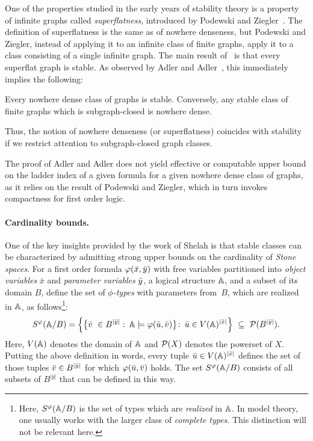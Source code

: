   One of the properties studied in the early 
  years of stability theory is 
  a property of infinite graphs  called \emph{superflatness}, introduced by Podewski and Ziegler~\cite{podewski1978stable}.
  The definition of superflatness is the same as   of nowhere denseness, but 
   Podewski and Ziegler,
  instead of applying it to an infinite class of finite graphs, apply it to a class consisting of a single infinite graph.
  The main result of~\cite{podewski1978stable} is that every superflat graph is stable.   
As observed by Adler and Adler~\cite{adler2014interpreting}, 
this immediately implies  the following:
 \begin{theorem}\label{thm:adleradler}
 	Every nowhere dense class of graphs is stable. Conversely, any stable class of finite graphs which is subgraph-closed  is nowhere dense.
 \end{theorem}
 Thus, the notion of nowhere denseness (or superflatness) coincides with stability if we restrict attention to subgraph-closed graph classes.
 
The proof of Adler and Adler does not yield effective or computable upper bound on the 
ladder index of a given formula for a given nowhere dense class of graphs, as it relies on the result of Podewski and Ziegler, which in turn invokes compactness for first order logic.

\paragraph{Cardinality bounds.}
One of the key insights provided by the work of Shelah is that stable classes can be characterized by admitting strong upper bounds on the cardinality of \emph{Stone spaces}.
For a first order formula $\varphi(\bar{x},\bar{y})$ 
with free variables partitioned into \emph{object variables} $\bar x$ and \emph{parameter variables} $\bar{y}$, a logical structure $\mathbb A$,
and a subset of its domain $B$, define
the set of \emph{$\phi$-types} with parameters from~$B$, which are realized in 
$\mathbb{A}$, as follows\footnote{Here, $S^\varphi(\mathbb A/B)$ is the set  of types which are \emph{realized} in $\mathbb A$. In model theory,
one usually works with the larger class of \emph{complete types}. This distinction will not be relevant here.}:
\begin{equation}\label{eq:stone-def}
S^\varphi(\mathbb{A}/B)=\left\{\big\{\bar{v}\ \in B^{|\bar y|}\, \colon\, \mathbb{A}\models\varphi(\bar{u},\bar{v})\big\} \colon\, \bar{u}\in V(\mathbb{A})^{|\bar x|}\right\}\ \subseteq\  \mathcal{P}(B^{|\bar y|}).
\end{equation}
Here, $V(\mathbb{A})$ denotes the domain of $\mathbb{A}$ and $\mathcal{P}(X)$ denotes the powerset of $X$.
Putting the above definition in words, every tuple $\bar{u}\in V(\mathbb{A})^{|\bar x|}$ defines the set of those tuples $\bar{v}\in B^{|\bar y|}$ for which $\varphi(\bar{u},\bar{v})$ holds.
The set $S^\varphi(\mathbb{A}/B)$ consists of all subsets of $B^{|\bar y|}$ that can be defined in this way.

